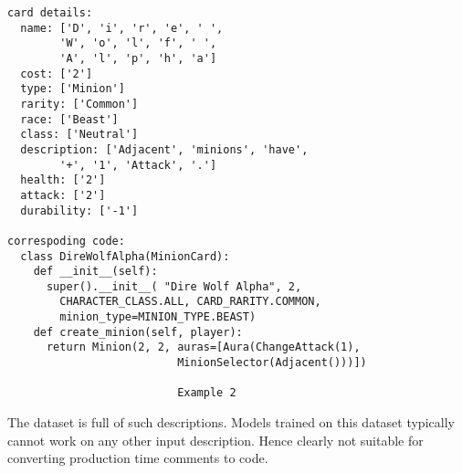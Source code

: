 \documentclass{IEEEtran}
\begin{document}
      \begin{lstlisting}[frame=single,basicstyle=\scriptsize]
card details:
  name: ['D', 'i', 'r', 'e', ' ', 
        'W', 'o', 'l', 'f', ' ', 
        'A', 'l', 'p', 'h', 'a']
  cost: ['2']
  type: ['Minion']
  rarity: ['Common']
  race: ['Beast']
  class: ['Neutral']
  description: ['Adjacent', 'minions', 'have', 
        '+', '1', 'Attack', '.']
  health: ['2']
  attack: ['2']
  durability: ['-1']

correspoding code:
  class DireWolfAlpha(MinionCard):
    def __init__(self):
      super().__init__( "Dire Wolf Alpha", 2, 
        CHARACTER_CLASS.ALL, CARD_RARITY.COMMON, 
        minion_type=MINION_TYPE.BEAST)
    def create_minion(self, player):
      return Minion(2, 2, auras=[Aura(ChangeAttack(1), 
                          MinionSelector(Adjacent()))])

                          Example 2
      \end{lstlisting}

      The dataset is full of such descriptions. Models trained on this dataset                                                                                        
       typically cannot work on any other input description. Hence clearly not                                                                                         
        suitable for converting production time comments to code.
\end{document}
